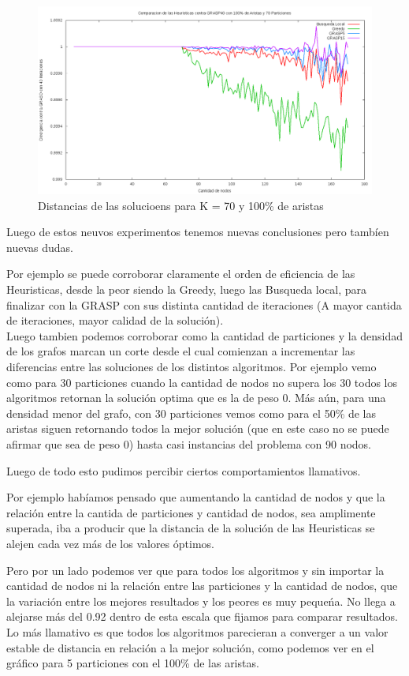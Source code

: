 \begin{figure}[H]
\begin{center}
\includegraphics[scale=0.4]{finales/muchosComparacionesCon70Particiones100Aristas.png}
\caption{Distancias de las solucioens para K = 70 y 100\% de aristas}
\end{center}
\end{figure}


Luego de estos neuvos experimentos tenemos nuevas conclusiones pero tamb\'ien nuevas dudas.

Por ejemplo se puede corroborar claramente el orden de eficiencia de las Heuristicas, desde la peor siendo la Greedy, luego las Busqueda local, para finalizar con la GRASP con sus distinta cantidad de iteraciones (A mayor cantida de iteraciones, mayor calidad de la soluci\'on).\\

Luego tambien podemos corroborar como la cantidad de particiones y la densidad de los grafos marcan un corte desde el cual comienzan a incrementar las diferencias entre las soluciones de los distintos algoritmos. Por ejemplo vemo como para 30 particiones cuando la cantidad de nodos no supera los 30 todos los algoritmos retornan la soluci\'on optima que es la de peso 0. M\'as a\'un, para una densidad menor del grafo, con 30 particiones vemos como para el 50\% de las aristas siguen retornando todos la mejor soluci\'on (que en este caso no se puede afirmar que sea de peso 0) hasta casi instancias del problema con 90 nodos.

Luego de todo esto pudimos percibir ciertos comportamientos llamativos.

Por ejemplo hab\'iamos pensado que aumentando la cantidad de nodos y que la relaci\'on entre la cantida de particiones y cantidad de nodos, sea amplimente superada, iba a producir que la distancia de la soluci\'on de las Heuristicas se alejen cada vez m\'as de los valores \'optimos.

Pero por un lado podemos ver que para todos los algoritmos y sin importar la cantidad de nodos ni la relaci\'on entre las particiones y la cantidad de nodos, que la variaci\'on entre los mejores resultados y los peores es muy peque\'na. No llega a alejarse m\'as del 0.92 dentro de esta escala que fijamos para comparar resultados.\\

Lo m\'as llamativo es que todos los algoritmos parecieran a converger a un valor estable de distancia en relaci\'on a la mejor soluci\'on, como podemos ver en el gr\'afico para 5 particiones con el 100\% de las aristas.